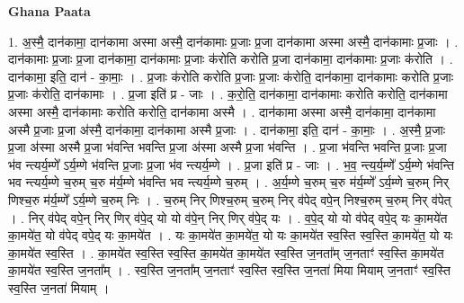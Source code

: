 \documentclass[17pt]{extarticle}
\begin{document}
\textbf{Ghana Paata } \newline

1. अ॒स्मै॒ दान॑कामा॒ दान॑कामा अस्मा अस्मै॒ दान॑कामाः प्र॒जाः प्र॒जा दान॑कामा अस्मा अस्मै॒ दान॑कामाः प्र॒जाः । . दान॑कामाः प्र॒जाः प्र॒जा दान॑कामा॒ दान॑कामाः प्र॒जाः क॑रोति करोति प्र॒जा दान॑कामा॒ दान॑कामाः प्र॒जाः क॑रोति । . दान॑कामा॒ इति॒ दान॑ - का॒माः॒ । . प्र॒जाः क॑रोति करोति प्र॒जाः प्र॒जाः क॑रोति॒ दान॑कामा॒ दान॑कामाः करोति प्र॒जाः प्र॒जाः क॑रोति॒ दान॑कामाः । . प्र॒जा इति॑ प्र - जाः । . क॒रो॒ति॒ दान॑कामा॒ दान॑कामाः करोति करोति॒ दान॑कामा अस्मा अस्मै॒ दान॑कामाः करोति करोति॒ दान॑कामा अस्मै । . दान॑कामा अस्मा अस्मै॒ दान॑कामा॒ दान॑कामा अस्मै प्र॒जाः प्र॒जा अ॑स्मै॒ दान॑कामा॒ दान॑कामा अस्मै प्र॒जाः । . दान॑कामा॒ इति॒ दान॑ - का॒माः॒ । . अ॒स्मै॒ प्र॒जाः प्र॒जा अ॑स्मा अस्मै प्र॒जा भ॑वन्ति भवन्ति प्र॒जा अ॑स्मा अस्मै प्र॒जा भ॑वन्ति । . प्र॒जा भ॑वन्ति भवन्ति प्र॒जाः प्र॒जा भ॑व न्त्यर्य॒म्णे᳚ ऽर्य॒म्णे भ॑वन्ति प्र॒जाः प्र॒जा भ॑व न्त्यर्य॒म्णे । . प्र॒जा इति॑ प्र - जाः । . भ॒व॒ न्त्य॒र्य॒म्णे᳚ ऽर्य॒म्णे भ॑वन्ति भव न्त्यर्य॒म्णे च॒रुम् च॒रु म॑र्य॒म्णे भ॑वन्ति भव न्त्यर्य॒म्णे च॒रुम् । . अ॒र्य॒म्णे च॒रुम् च॒रु म॑र्य॒म्णे᳚ ऽर्य॒म्णे च॒रुम् निर् णिश्च॒रु म॑र्य॒म्णे᳚ ऽर्य॒म्णे च॒रुम् निः । . च॒रुम् निर् णिश्च॒रुम् च॒रुम् निर् व॑पेद् वपे॒न् निश्च॒रुम् च॒रुम् निर् व॑पेत् । . निर् व॑पेद् वपे॒न् निर् णिर् व॑पे॒द् यो यो व॑पे॒न् निर् णिर् व॑पे॒द् यः । . व॒पे॒द् यो यो व॑पेद् वपे॒द् यः का॒मये॑त का॒मये॑त॒ यो व॑पेद् वपे॒द् यः का॒मये॑त । . यः का॒मये॑त का॒मये॑त॒ यो यः का॒मये॑त स्व॒स्ति स्व॒स्ति का॒मये॑त॒ यो यः का॒मये॑त स्व॒स्ति । . का॒मये॑त स्व॒स्ति स्व॒स्ति का॒मये॑त का॒मये॑त स्व॒स्ति ज॒नता᳚म् ज॒नताꣳ॑ स्व॒स्ति का॒मये॑त का॒मये॑त स्व॒स्ति ज॒नता᳚म् । . स्व॒स्ति ज॒नता᳚म् ज॒नताꣳ॑ स्व॒स्ति स्व॒स्ति ज॒नता॑ मिया मियाम् ज॒नताꣳ॑ स्व॒स्ति स्व॒स्ति ज॒नता॑ मियाम् । \newline
\end{document}
